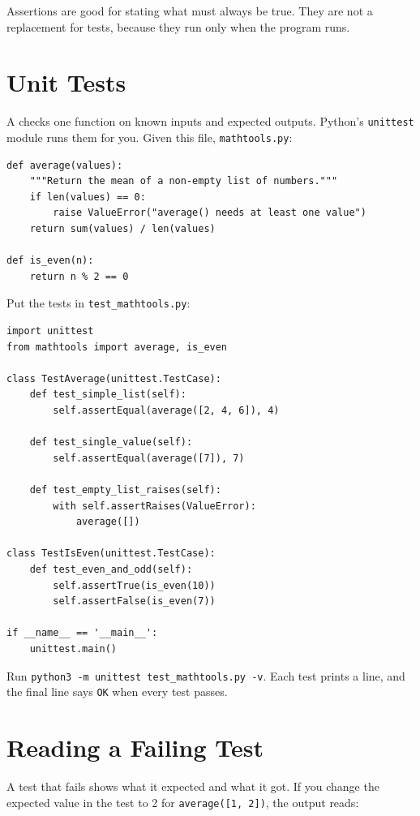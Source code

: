 Assertions are good for stating what must always be true. They are not a
replacement for tests, because they run only when the program runs.

\section{Unit Tests}
A  checks one function on known inputs and expected outputs.
Python's \texttt{unittest} module runs them for you. Given this file,
\texttt{mathtools.py}:

\begin{verbatim}
def average(values):
    """Return the mean of a non-empty list of numbers."""
    if len(values) == 0:
        raise ValueError("average() needs at least one value")
    return sum(values) / len(values)

def is_even(n):
    return n % 2 == 0
\end{verbatim}

Put the tests in \texttt{test\_mathtools.py}:

\begin{verbatim}
import unittest
from mathtools import average, is_even

class TestAverage(unittest.TestCase):
    def test_simple_list(self):
        self.assertEqual(average([2, 4, 6]), 4)

    def test_single_value(self):
        self.assertEqual(average([7]), 7)

    def test_empty_list_raises(self):
        with self.assertRaises(ValueError):
            average([])

class TestIsEven(unittest.TestCase):
    def test_even_and_odd(self):
        self.assertTrue(is_even(10))
        self.assertFalse(is_even(7))

if __name__ == '__main__':
    unittest.main()
\end{verbatim}

Run \texttt{python3 -m unittest test\_mathtools.py -v}. Each test prints a
line, and the final line says \texttt{OK} when every test passes.

\section{Reading a Failing Test}
A test that fails shows what it expected and what it got. If you change the
expected value in the test to 2 for \texttt{average([1, 2])}, the output
reads:

